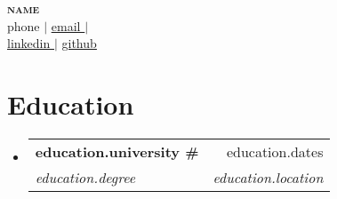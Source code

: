 \documentclass[letterpaper,11pt]{article}
\makeatletter
\newcommand{\resumeSubheading}[4]{
  \vspace{-2pt}\item
    \begin{tabular*}{0.97\textwidth}[t]{l@{\extracolsep{\fill}}r}
      \textbf{#1#} & #2 \\
      \textit{\small#3} & \textit{\small #4} \\
    \end{tabular*}\vspace{-7pt}
}
\newcommand{\resumeSubHeadingListStart}{\begin{itemize}[leftmargin=0.15in, label={}]}
\newcommand{\resumeSubHeadingListEnd}{\end{itemize}}
\makeatother
\begin{document}
\begin{center}
    \textbf{\Huge \scshape {{ name }}} \\\vspace{1pt}
    \small {{ phone }} $|$ \href{mailto:{{ email }}}{\underline{{ email }}} $|$ \\
    \href{ {{ linkedin }}}{\underline{{ linkedin }}} $|$ 
    \href{ {{ github }}}{\underline{{ github }}}
\end{center}

\section{Education}
  \resumeSubHeadingListStart
    \resumeSubheading
      { {{ education.university }} }{ {{ education.dates }} }
      { {{ education.degree }} }{ {{ education.location }} }
  \resumeSubHeadingListEnd

\end{document}
